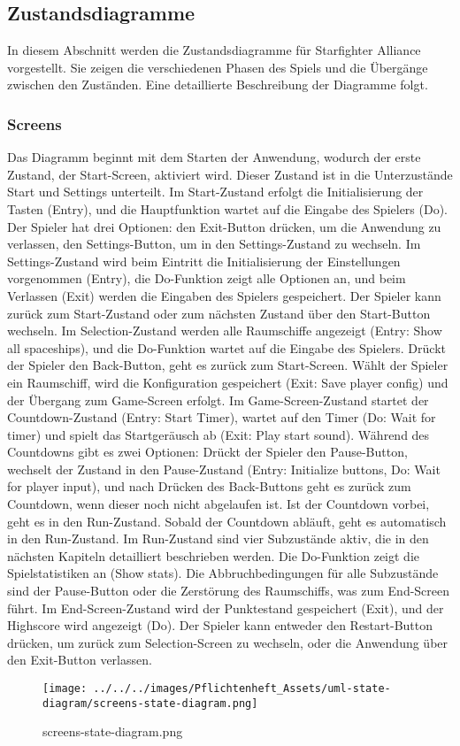 \documentclass[10pt]{article}
\begin{document}
    	\subsection{Zustandsdiagramme}
    	In diesem Abschnitt werden die Zustandsdiagramme für Starfighter Alliance vorgestellt. Sie zeigen die verschiedenen Phasen des Spiels und die Übergänge zwischen den Zuständen. Eine detaillierte Beschreibung der Diagramme folgt.

\subsubsection{Screens}    	
Das Diagramm beginnt mit dem Starten der Anwendung, wodurch der erste Zustand, der Start-Screen, aktiviert wird. Dieser Zustand ist in die Unterzustände Start und Settings unterteilt. Im Start-Zustand erfolgt die Initialisierung der Tasten (Entry), und die Hauptfunktion wartet auf die Eingabe des Spielers (Do). Der Spieler hat drei Optionen: den Exit-Button drücken, um die Anwendung zu verlassen, den Settings-Button, um in den Settings-Zustand zu wechseln.
Im Settings-Zustand wird beim Eintritt die Initialisierung der Einstellungen vorgenommen (Entry), die Do-Funktion zeigt alle Optionen an, und beim Verlassen (Exit) werden die Eingaben des Spielers gespeichert. Der Spieler kann zurück zum Start-Zustand oder zum nächsten Zustand über den Start-Button wechseln.
Im Selection-Zustand werden alle Raumschiffe angezeigt (Entry: Show all spaceships), und die Do-Funktion wartet auf die Eingabe des Spielers. Drückt der Spieler den Back-Button, geht es zurück zum Start-Screen. Wählt der Spieler ein Raumschiff, wird die Konfiguration gespeichert (Exit: Save player config) und der Übergang zum Game-Screen erfolgt.
Im Game-Screen-Zustand startet der Countdown-Zustand (Entry: Start Timer), wartet auf den Timer (Do: Wait for timer) und spielt das Startgeräusch ab (Exit: Play start sound). Während des Countdowns gibt es zwei Optionen: Drückt der Spieler den Pause-Button, wechselt der Zustand in den Pause-Zustand (Entry: Initialize buttons, Do: Wait for player input), und nach Drücken des Back-Buttons geht es zurück zum Countdown, wenn dieser noch nicht abgelaufen ist. Ist der Countdown vorbei, geht es in den Run-Zustand. Sobald der Countdown abläuft, geht es automatisch in den Run-Zustand.
Im Run-Zustand sind vier Subzustände aktiv, die in den nächsten Kapiteln detailliert beschrieben werden. Die Do-Funktion zeigt die Spielstatistiken an (Show stats). Die Abbruchbedingungen für alle Subzustände sind der Pause-Button oder die Zerstörung des Raumschiffs, was zum End-Screen führt. Im End-Screen-Zustand wird der Punktestand gespeichert (Exit), und der Highscore wird angezeigt (Do). Der Spieler kann entweder den Restart-Button drücken, um zurück zum Selection-Screen zu wechseln, oder die Anwendung über den Exit-Button verlassen.\\
\begin{figure}
	\centering
	\texttt{[image: ../../../images/Pflichtenheft\_Assets/uml-state-diagram/screens-state-diagram.png]}\\
	\caption{screens-state-diagram.png}
\end{figure}
\end{document}
